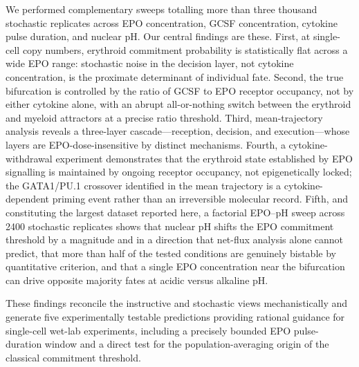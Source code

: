 We performed complementary sweeps totalling more than three thousand stochastic
replicates across EPO concentration, GCSF concentration, cytokine pulse
duration, and nuclear pH. Our central findings are these. First, at single-cell
copy numbers, erythroid commitment probability is statistically flat across a
wide EPO range: stochastic noise in the decision layer, not cytokine
concentration, is the proximate determinant of individual fate. Second, the true
bifurcation is controlled by the ratio of GCSF to EPO receptor occupancy, not
by either cytokine alone, with an abrupt all-or-nothing switch between the
erythroid and myeloid attractors at a precise ratio threshold. Third,
mean-trajectory analysis reveals a three-layer cascade---reception, decision,
and execution---whose layers are EPO-dose-insensitive by distinct mechanisms.
Fourth, a cytokine-withdrawal experiment demonstrates that the erythroid state
established by EPO signalling is maintained by ongoing receptor occupancy, not
epigenetically locked; the GATA1/PU.1 crossover identified in the mean
trajectory is a cytokine-dependent priming event rather than an irreversible
molecular record. Fifth, and constituting the largest dataset reported here, a
factorial EPO--pH sweep across 2400 stochastic replicates shows that nuclear pH
shifts the EPO commitment threshold by a magnitude and in a direction that
net-flux analysis alone cannot predict, that more than half of the tested
conditions are genuinely bistable by quantitative criterion, and that a single
EPO concentration near the bifurcation can drive opposite majority fates at
acidic versus alkaline pH.

These findings reconcile the instructive and stochastic views mechanistically
and generate five experimentally testable predictions providing rational guidance
for single-cell wet-lab experiments, including a precisely bounded EPO
pulse-duration window and a direct test for the population-averaging origin of
the classical commitment threshold.
